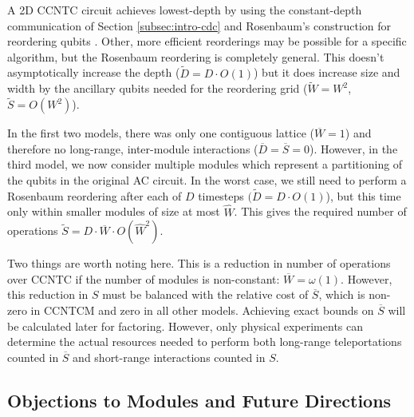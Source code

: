 A \textsf{2D CCNTC} circuit achieves lowest-depth by using the constant-depth
communication of Section \ref{subsec:intro-cdc} and Rosenbaum's
construction for reordering qubits \cite{Rosenbaum2012}. Other, more
efficient reorderings may be possible for a specific algorithm, but
the Rosenbaum reordering is completely general. This doesn't
asymptotically increase the depth ($\tilde{D} = D\cdot O(1)$) but it does
increase size and width by the ancillary qubits needed for the reordering
grid ($\tilde{W} = W^2$, $\tilde{S} = O(W^2)$).

In the first two models, there was only one contiguous lattice
($\overline{W} = 1$) and therefore no long-range, inter-module interactions
($\overline{D} = \overline{S} = 0$). However, in the third model, we now
consider multiple modules which represent a partitioning of the qubits
in the original \textsf{AC} circuit. In the worst case, we still need to
perform a Rosenbaum reordering after each of $D$ timesteps $(\tilde{D} = D\cdot O(1)$), but this time
only within smaller modules of size at most $\hat{W}$. This gives the
required number of operations $\tilde{S} = D\cdot \overline{W} \cdot O(\hat{W}^2)$.

Two things are worth noting here.
This is a reduction in number of operations over \textsf{CCNTC} if
the number of modules is non-constant:
$\overline{W} = \omega(1)$. However, this reduction in $S$ must be
balanced with the relative cost of $\overline{S}$, which is non-zero in
\textsf{CCNTCM} and zero in all other models. Achieving exact bounds on
$\overline{S}$ will be calculated later for factoring. However, only
physical experiments can determine the actual resources needed to
perform both long-range teleportations counted in $\overline{S}$ and
short-range interactions counted in $S$.






\subsection{Objections to Modules and Future Directions}
\label{subsec:module-size}

